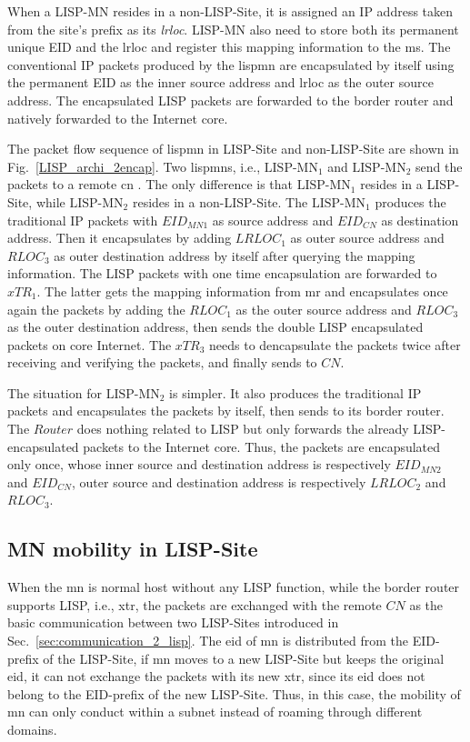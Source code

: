 When a LISP-MN resides in a non-LISP-Site, it is assigned an IP address taken from the site's prefix as its \emph{\acrshort{lrloc}}. LISP-MN also need to store both its permanent unique EID and the \acrshort{lrloc} and register this mapping information to the \acrshort{ms}. The conventional IP packets produced by the \acrshort{lispmn} are encapsulated by itself using the permanent EID as the inner source address and \acrshort{lrloc} as the outer source address. The encapsulated LISP packets are forwarded to the border router and natively forwarded to the Internet core. 

The packet flow sequence of \acrshort{lispmn} in LISP-Site and non-LISP-Site are shown in Fig.~\ref{LISP_archi_2encap}. Two \acrshort{lispmn}s, i.e., $\text{LISP-MN}_1$ and $\text{LISP-MN}_2$ send the packets to a remote \acrfull{cn} . The only difference is that $\text{LISP-MN}_1$ resides in a LISP-Site, while $\text{LISP-MN}_2$ resides in a non-LISP-Site. The $\text{LISP-MN}_1$ produces the traditional IP packets with $EID_{MN1}$ as source address and $EID_{CN}$ as destination address. Then it encapsulates by adding $LRLOC_1$ as outer source address and $RLOC_3$ as outer destination address by itself after querying the mapping information. The LISP packets with one time encapsulation are forwarded to $xTR_1$. The latter gets the mapping information from \acrshort{mr} and encapsulates once again the packets by adding the $RLOC_1$ as the outer source address and $RLOC_3$ as the outer destination address, then sends the double LISP encapsulated packets on core Internet. The $xTR_3$ needs to dencapsulate the packets twice after receiving and verifying the packets, and finally sends to $CN$.

The situation for $\text{LISP-MN}_2$ is simpler. It also produces the traditional IP packets and encapsulates the packets by itself, then sends to its border router. The $Router$ does nothing related to LISP but only forwards the already LISP-encapsulated packets to the Internet core. Thus, the packets are encapsulated only once, whose inner source and destination address is respectively $EID_{MN2}$ and $EID_{CN}$, outer source and destination address is respectively $LRLOC_2$ and $RLOC_3$.


\subsection{MN mobility in LISP-Site}
\label{subsec:MN_LS}
When the \acrshort{mn} is normal host without any LISP function, while the border router supports LISP, i.e., \acrshort{xtr}, the packets are exchanged with the remote $CN$ as the basic communication between two LISP-Sites introduced in Sec.~\ref{sec:communication_2_lisp}. The \acrshort{eid} of \acrshort{mn} is distributed from the EID-prefix of the LISP-Site, if \acrshort{mn} moves to a new LISP-Site but keeps the original \acrshort{eid}, it can not exchange the packets with its new \acrshort{xtr}, since its \acrshort{eid} does not belong to the EID-prefix of the new LISP-Site. Thus, in this case, the mobility of \acrshort{mn} can only conduct within a subnet instead of roaming through different domains.


